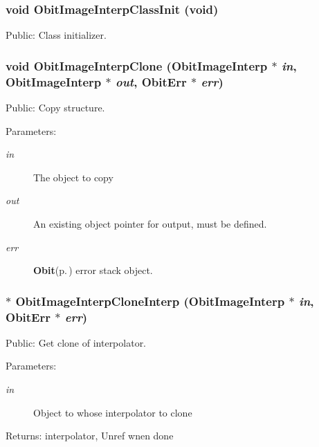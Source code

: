 \subsubsection{\setlength{\rightskip}{0pt plus 5cm}void Obit\-Image\-Interp\-Class\-Init (void)}\label{ObitImageInterp_8h_a8}


Public: Class initializer. 

\subsubsection{\setlength{\rightskip}{0pt plus 5cm}void Obit\-Image\-Interp\-Clone ({\bf Obit\-Image\-Interp} $\ast$ {\em in}, {\bf Obit\-Image\-Interp} $\ast$ {\em out}, {\bf Obit\-Err} $\ast$ {\em err})}\label{ObitImageInterp_8h_a12}


Public: Copy structure. 

\begin{Desc}
\item[Parameters:]
\begin{description}
\item[{\em in}]The object to copy \item[{\em out}]An existing object pointer for output, must be defined. \item[{\em err}]{\bf Obit}{\rm (p.\,\pageref{structObit})} error stack object. \end{description}
\end{Desc}
\subsubsection{$\ast$ Obit\-Image\-Interp\-Clone\-Interp ({\bf Obit\-Image\-Interp} $\ast$ {\em in}, {\bf Obit\-Err} $\ast$ {\em err})}\label{ObitImageInterp_8h_a17}


Public: Get clone of interpolator. 

\begin{Desc}
\item[Parameters:]
\begin{description}
\item[{\em in}]Object to whose interpolator to clone \end{description}
\end{Desc}
\begin{Desc}
\item[Returns:]interpolator, Unref wnen done \end{Desc}
